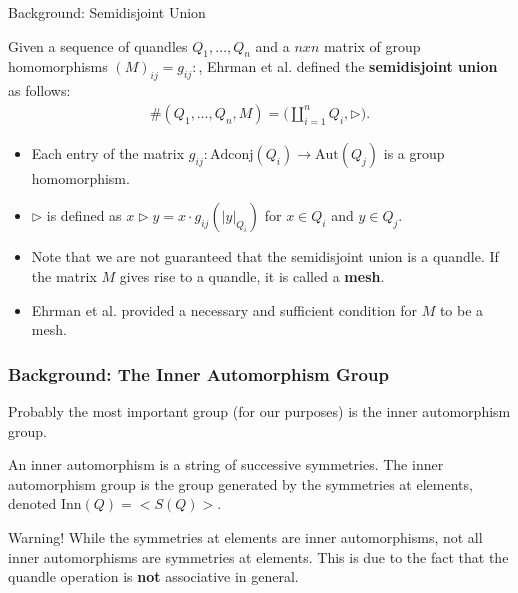 \documentclass[10pt]{beamer}
\newcommand{\Aut}{\mathrm{Aut}} %
\newcommand{\thru}{\rhd} %
\newcommand{\Inn}{\mathrm{Inn}} %
\newcommand{\Adconj}{\mathrm{Adconj}} %
\theoremstyle{plain}
\begin{document}
    \begin{frame}{Background: Semidisjoint Union}
        \begin{definition}\cite{ehrman2008toward}
        Given a sequence of quandles $Q_1, \dots , Q_n$ and a $nxn$ matrix of group homomorphisms $(M)_{ij} = g_{ij} : $, Ehrman et al. \cite{ehrman2008toward} defined the \textbf{semidisjoint union} as follows:
        \begin{align*}
            \#(Q_1, \dots, Q_n, M) = \Big(\coprod_{i = 1}^nQ_i, \thru\Big).
        \end{align*}
        \end{definition}
        \pause
        \begin{itemize}
            \item Each entry of the matrix $g_{ij}:\Adconj (Q_i)\to \Aut(Q_j)$ is a group homomorphism. 
            
            \item $\thru$ is defined as $x\thru y = x\cdot g_{ij}(|y|_{Q_i})$ for $x\in Q_i$ and $y\in Q_j$.
            
            \item Note that we are not guaranteed that the semidisjoint union is a quandle. If the matrix $M$ gives rise to a quandle, it is called a \textbf{mesh}.
            \item Ehrman et al. provided a necessary and sufficient condition for $M$ to be a mesh.
        \end{itemize}
        
    \end{frame}


    \begin{frame}
        \frametitle{Background: The Inner Automorphism Group}

        Probably the most important group (for our purposes) is the inner automorphism group.


    \begin{definition}
        An inner automorphism is a string of successive symmetries. The inner automorphism group is the group generated by the symmetries at elements, denoted $\Inn(Q) = <S(Q)>$.
        \end{definition}
        
        
        Warning! While the symmetries at elements are inner automorphisms, not all inner automorphisms are symmetries at elements. This is due to the fact that the quandle operation is \textbf{not} associative in general. 
        
    \end{frame}
\end{document}
